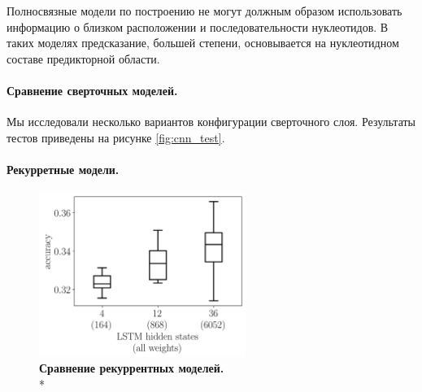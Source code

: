  Полносвязные модели по построению не могут должным образом использовать информацию о близком расположении и последовательности нуклеотидов. В таких моделях предсказание, большей степени, основывается на нуклеотидном составе предикторной области.
 



\paragraph{Сравнение сверточных моделей.} Мы исследовали несколько вариантов конфигурации сверточного слоя. Результаты тестов приведены на рисунке \ref{fig:cnn_test}.



\paragraph{Рекурретные модели.}
\begin{figure}[h] %
	\centering
	\includegraphics[width = 0.6\textwidth]{pics/rnn_models_all_runs_p1_ecoli_100000_10000_50_0.png}
	\caption{{\bfseries Сравнение рекуррентных моделей.} \\* 
		   \mannwhitni }
	\label{fig:rnn_test}	
\end{figure}

	